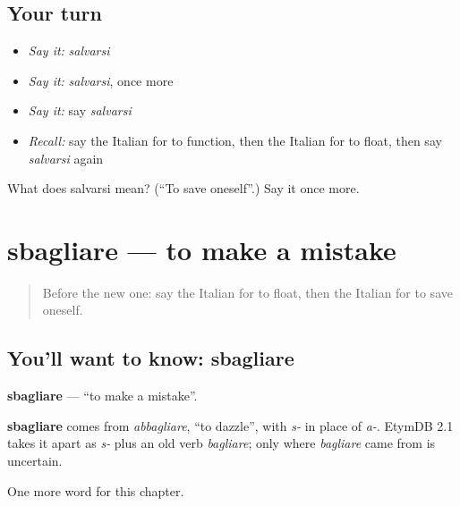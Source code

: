 \subsection*{Your turn}
\begin{itemize}
\raggedright
  \item \emph{Say it:} \emph{salvarsi}
  \item \emph{Say it:} \emph{salvarsi}, once more
  \item \emph{Say it:} say \emph{salvarsi}
  \item \emph{Recall:} say the Italian for to function, then the Italian for to float, then say \emph{salvarsi} again
\end{itemize}

\begin{tcolorbox}[breakable,colback=teal!4,colframe=teal!35!black,title={Before you move on}]
What does salvarsi mean? (\textquotedblleft{}To save oneself\textquotedblright{}.) Say it once more.
\end{tcolorbox}
\section[sbagliare]{sbagliare — to make a mistake}

\label{lesson:IT-C150-sbagliare}



\begin{quote}
Before the new one: say the Italian for to float, then the Italian for to save oneself.
\end{quote}

\subsection*{You'll want to know: sbagliare}
\textbf{sbagliare} — \textquotedblleft{}to make a mistake\textquotedblright{}.

\begin{cousinweb}
\textbf{sbagliare} comes from \emph{abbagliare}, \textquotedblleft{}to dazzle\textquotedblright{}, with \emph{s-} in place of \emph{a-}. EtymDB 2.1 takes it apart as \emph{s-} plus an old verb \emph{bagliare}; only where \emph{bagliare} came from is uncertain.
\end{cousinweb}

\begin{grammarlens}[title={What you've built}]
One more word for this chapter.
\end{grammarlens}

